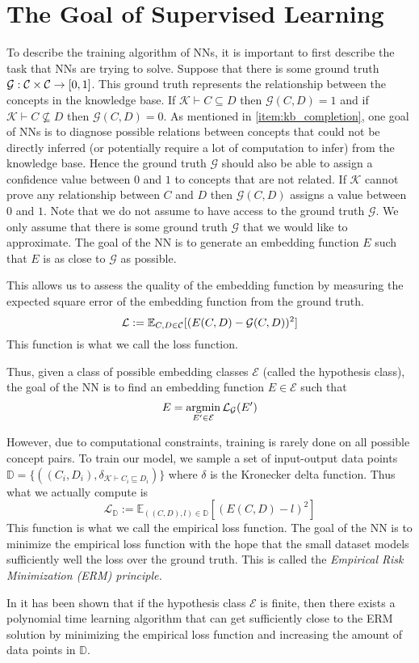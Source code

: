 \section{The Goal of Supervised Learning}
To describe the training algorithm of NNs, it is important to first describe the task 
that NNs are trying to solve.
Suppose that there is some ground truth $\mathcal{G}:\mathcal{C}\times\mathcal{C}\to[0,1]$.
This ground truth represents the relationship between the concepts in the knowledge base.
If $\mathcal{K}\vdash C\subseteq D$ then $\mathcal{G}(C,D)=1$ and if $\mathcal{K}\vdash C\not\subseteq D$ then $\mathcal{G}(C,D)=0$.
As mentioned in \ref{item:kb_completion}, one goal of NNs is
to diagnose possible relations between concepts that could not be directly inferred (or potentially require a lot of computation to infer) from the knowledge base.
Hence the ground truth $\mathcal{G}$ should also be able to assign a confidence value between $0$ and $1$ to concepts that are not related.
If $\mathcal{K}$ cannot prove any relationship between $C$ and $D$ then $\mathcal{G}(C,D)$ assigns a value between $0$ and $1$.
Note that we do not assume to have access to the ground truth $\mathcal{G}$.
We only assume that there is some ground truth $\mathcal{G}$ that we would like to approximate.
The goal of the NN is to generate an embedding function $E$ such that $E$ is as close to $\mathcal{G}$ as possible.

This allows us to assess the quality of the embedding function by measuring the expected square error of the embedding function from the ground truth.
\[
    \mathcal{L}:=\mathbb{E}_{C,D\in\mathcal{C}}[(E(C,D)-\mathcal{G}(C,D))^2]
\]
This function is what we call the loss function.

Thus, given a class of possible embedding classes $\mathcal{E}$ (called the hypothesis class), the goal of the NN is to find an embedding function $E\in\mathcal{E}$
such that
\[
    E=\mathop{\mathrm{argmin}}\limits_{E'\in\mathcal{E}}\mathcal{L}_{\mathcal{G}}(E')    
\]


However, due to computational constraints, 
training is rarely done on all possible concept pairs. To train our model, we sample a set of input-output
data points $\mathbb{D}=\{((C_i,D_i),\delta_{\mathcal{K}\vdash C_i\sqsubseteq D_i})\}$
where $\delta$ is the Kronecker delta function.
Thus what we actually compute is
\[
    \mathcal{L}_{\mathbb{D}}:=\mathbb{E}_{((C,D),l)\in\mathbb{D}}[(E(C,D)-l)^2]
\]
This function is what we call the empirical loss function. The goal of the NN is to minimize the empirical loss function
with the hope that the small dataset models sufficiently well the loss over the ground truth.
This is called the \it{Empirical Risk Minimization} (ERM) principle.

In \cite{AgnosticPAC} it has been shown that if the hypothesis class $\mathcal{E}$ is finite, 
then there exists a polynomial time learning algorithm
that can get sufficiently close to the ERM solution by minimizing the empirical loss function
and increasing the amount of data points in $\mathbb{D}$.